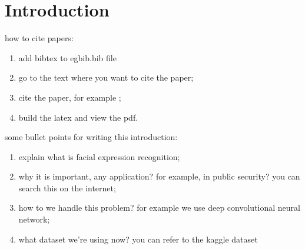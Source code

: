 
\section{Introduction}

how to cite papers:
\begin{enumerate}
	\item add bibtex to egbib.bib file
	\item go to the text where you want to cite the paper;
	\item cite the paper, for example \cite{szegedy2017inception} ;
	\item build the latex and view the pdf.
\end{enumerate}

some bullet points for writing this introduction:
\begin{enumerate}
	\item explain what is facial expression recognition;
	\item why it is important, any application? for example, in public security?
	you can search this on the internet;
	\item how to we handle this problem? for example we use deep convolutional neural network;
	\item what dataset we're using now? you can refer to the kaggle dataset
\end{enumerate}
